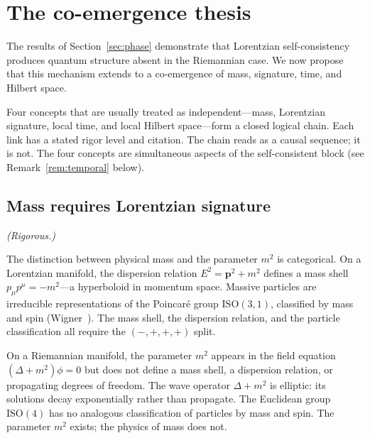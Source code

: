 \documentclass[12pt,a4paper]{article}
\theoremstyle{definition}
\theoremstyle{remark}
\begin{document}
\section{The co-emergence thesis}
\label{sec:coemergence}

The results of Section~\ref{sec:phase} demonstrate that Lorentzian
self-consistency produces quantum structure absent in the Riemannian
case. We now propose that this mechanism extends to a co-emergence of
mass, signature, time, and Hilbert space.

Four concepts that are usually treated as independent---mass, Lorentzian
signature, local time, and local Hilbert space---form a closed logical
chain. Each link has a stated rigor level and citation. The chain reads
as a causal sequence; it is not. The four concepts are simultaneous
aspects of the self-consistent block (see Remark~\ref{rem:temporal}
below).

\subsection{Mass requires Lorentzian signature}
\label{sec:mass_signature}

\emph{(Rigorous.)}

\medskip

\noindent The distinction between physical mass and the parameter $m^2$
is categorical. On a Lorentzian manifold, the dispersion relation
$E^2 = \mathbf{p}^2 + m^2$ defines a mass shell $p_\mu p^\mu = -m^2$---a
hyperboloid in momentum space. Massive particles are irreducible
representations of the Poincar\'e group $\mathrm{ISO}(3,1)$, classified
by mass and spin (Wigner~\cite{wigner}). The mass shell, the dispersion
relation, and the particle classification all require the $(-,+,+,+)$
split.

On a Riemannian manifold, the parameter $m^2$ appears in the field
equation $(\Delta + m^2)\phi = 0$ but does not define a mass shell, a
dispersion relation, or propagating degrees of freedom. The wave operator
$\Delta + m^2$ is elliptic: its solutions decay exponentially rather than
propagate. The Euclidean group $\mathrm{ISO}(4)$ has no analogous
classification of particles by mass and spin. The parameter $m^2$ exists;
the physics of mass does not.
\end{document}
